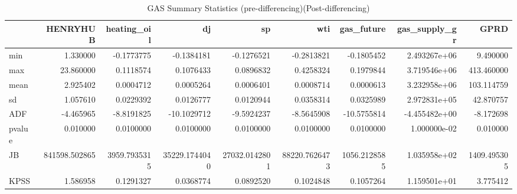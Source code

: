 \begin{table}
\centering
\caption{GAS Summary Statistics (pre-differencing)(Post-differencing)}
\centering
\begin{tabular}[t]{l|r|r|r|r|r|r|r|r}
\hline
  & HENRYHUB & heating\_oil & dj & sp & wti & gas\_future & gas\_supply\_gr & GPRD\\
\hline
min & 1.330000 & -0.1773775 & -0.1384181 & -0.1276521 & -0.2813821 & -0.1805452 & 2.493267e+06 & 9.490000\\
\hline
max & 23.860000 & 0.1118574 & 0.1076433 & 0.0896832 & 0.4258324 & 0.1979844 & 3.719546e+06 & 413.460000\\
\hline
mean & 2.925402 & 0.0004712 & 0.0005264 & 0.0006401 & 0.0008714 & 0.0000613 & 3.232958e+06 & 103.114759\\
\hline
sd & 1.057610 & 0.0229392 & 0.0126777 & 0.0120944 & 0.0358314 & 0.0325989 & 2.972831e+05 & 42.870757\\
\hline
ADF & -4.465965 & -8.8191825 & -10.1029712 & -9.5924237 & -8.5645908 & -10.5755814 & -4.455482e+00 & -8.172698\\
\hline
pvalue & 0.010000 & 0.0100000 & 0.0100000 & 0.0100000 & 0.0100000 & 0.0100000 & 1.000000e-02 & 0.010000\\
\hline
JB & 841598.502865 & 3959.7935315 & 35229.1744040 & 27032.0142801 & 88220.7626473 & 1056.2128585 & 1.035958e+02 & 1409.495305\\
\hline
KPSS & 1.586958 & 0.1291327 & 0.0368774 & 0.0892520 & 0.1024848 & 0.1057264 & 1.159501e+01 & 3.775412\\
\hline
\end{tabular}
\end{table}
